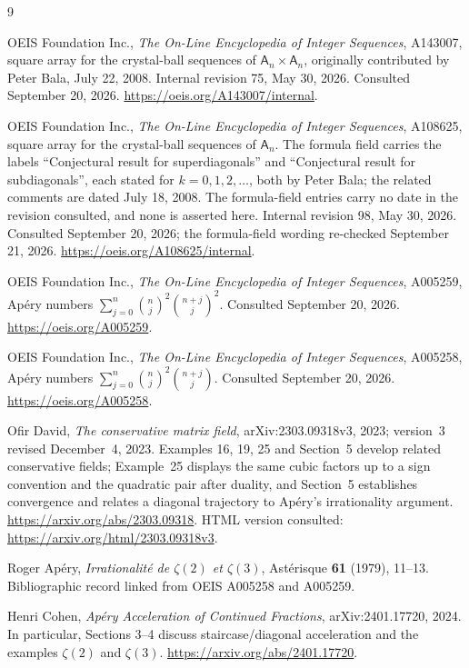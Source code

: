 \documentclass[11pt,letterpaper]{article}
\numberwithin{equation}{section}
\theoremstyle{definition}
\begin{document}
\clearpage
\begin{thebibliography}{9}

OEIS Foundation Inc., \emph{The On-Line Encyclopedia of Integer
Sequences}, A143007, square array for the crystal-ball sequences of
$\mathsf A_n\times\mathsf A_n$, originally contributed by Peter Bala,
July 22, 2008. Internal revision 75, May 30, 2026. Consulted September
20, 2026. \url{https://oeis.org/A143007/internal}.

OEIS Foundation Inc., \emph{The On-Line Encyclopedia of Integer
Sequences}, A108625, square array for the crystal-ball sequences of
$\mathsf A_n$. The formula field carries the labels ``Conjectural result
for superdiagonals'' and ``Conjectural result for subdiagonals'', each
stated for $k=0,1,2,\ldots$, both by Peter Bala; the related comments are
dated July 18, 2008.  The formula-field entries carry no date in the
revision consulted, and none is asserted here. Internal revision 98, May 30,
2026. Consulted September 20, 2026; the formula-field wording re-checked
September 21, 2026. \url{https://oeis.org/A108625/internal}.

OEIS Foundation Inc., \emph{The On-Line Encyclopedia of Integer
Sequences}, A005259, Ap\'ery numbers
$\sum_{j=0}^n\binom nj^2\binom{n+j}{j}^2$.
Consulted September 20, 2026. \url{https://oeis.org/A005259}.

OEIS Foundation Inc., \emph{The On-Line Encyclopedia of Integer
Sequences}, A005258, Ap\'ery numbers
$\sum_{j=0}^n\binom nj^2\binom{n+j}{j}$.
Consulted September 20, 2026. \url{https://oeis.org/A005258}.

Ofir David, \emph{The conservative matrix field}, arXiv:2303.09318v3,
2023; version~3 revised December~4, 2023. Examples 16, 19, 25 and
Section~5 develop related conservative fields; Example~25 displays the
same cubic factors up to a sign convention and the quadratic pair after
duality, and Section~5 establishes convergence and relates a diagonal
trajectory to Ap\'ery's irrationality argument.
\url{https://arxiv.org/abs/2303.09318}. HTML version consulted:
\url{https://arxiv.org/html/2303.09318v3}.

Roger Ap\'ery, \emph{Irrationalit\'e de $\zeta(2)$ et $\zeta(3)$},
Ast\'erisque \textbf{61} (1979), 11--13. Bibliographic record linked
from OEIS A005258 and A005259.

Henri Cohen, \emph{Ap\'ery Acceleration of Continued Fractions},
arXiv:2401.17720, 2024. In particular, Sections 3--4 discuss
staircase/diagonal acceleration and the examples $\zeta(2)$ and
$\zeta(3)$. \url{https://arxiv.org/abs/2401.17720}.


\end{thebibliography}
\end{document}
